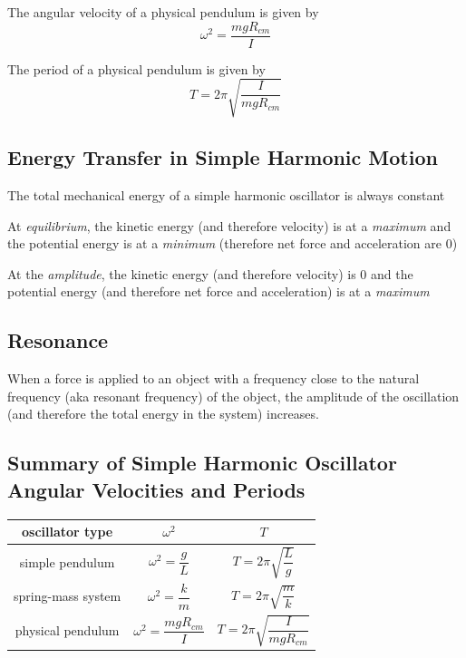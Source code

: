 \documentclass[titlepage]{article}
\begin{document}
The angular velocity of a physical pendulum is given by
\begin{equation*}
    \omega ^ 2 = \frac{mg R_{cm}}{I}
\end{equation*}

The period of a physical pendulum is given by
\begin{equation*}
    T = 2 \pi \sqrt{\frac{I}{mg R_{cm}}}
\end{equation*}

\subsection{Energy Transfer in Simple Harmonic Motion}
The total mechanical energy of a simple harmonic oscillator is always constant

At \emph{equilibrium}, the kinetic energy (and therefore velocity) is at a \emph{maximum} and the potential energy is at a \emph{minimum} (therefore net force and acceleration are 0)

At the \emph{amplitude}, the kinetic energy (and therefore velocity) is 0 and the potential energy (and therefore net force and acceleration) is at a \emph{maximum}

\subsection{Resonance}
When a force is applied to an object with a frequency close to the natural frequency (aka resonant frequency) of the object, the amplitude of the oscillation (and therefore the total energy in the system) increases.

\subsection{Summary of Simple Harmonic Oscillator Angular Velocities and Periods}

\begin{table}[H]
    \centering
    \makegapedcells
    \begin{tabular}{c|c|c}
        {oscillator type} & $\omega^2$ & $T$                   \\
        \hline
        {simple pendulum} & $\omega^2 = \dfrac{g}{L}$ & $T = 2 \pi \sqrt{\dfrac{L}{g}}$ \\
        {spring-mass system} & $\omega^2 = \dfrac{k}{m}$ & $T = 2 \pi \sqrt{\dfrac{m}{k}}$ \\
        {physical pendulum} & $\omega^2 = \dfrac{mg R_{cm}}{I}$ & $T = 2 \pi \sqrt{\dfrac{I}{mg R_{cm}}}$
    \end{tabular}
\end{table}
\end{document}
